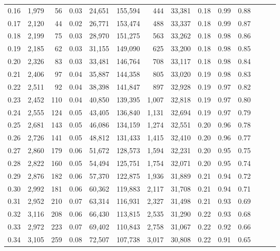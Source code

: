 \begin{tabular}{rrrrrrrrrrrrrr}
0.16 &  1,979 &   56 &  0.03 &   24,651 &  155,594 &     444 &  33,381 &  0.18 &  0.99 &      0.88 \\
0.17 &  2,120 &   44 &  0.02 &   26,771 &  153,474 &     488 &  33,337 &  0.18 &  0.99 &      0.87 \\
0.18 &  2,199 &   75 &  0.03 &   28,970 &  151,275 &     563 &  33,262 &  0.18 &  0.98 &      0.86 \\
0.19 &  2,185 &   62 &  0.03 &   31,155 &  149,090 &     625 &  33,200 &  0.18 &  0.98 &      0.85 \\
0.20 &  2,326 &   83 &  0.03 &   33,481 &  146,764 &     708 &  33,117 &  0.18 &  0.98 &      0.84 \\
0.21 &  2,406 &   97 &  0.04 &   35,887 &  144,358 &     805 &  33,020 &  0.19 &  0.98 &      0.83 \\
0.22 &  2,511 &   92 &  0.04 &   38,398 &  141,847 &     897 &  32,928 &  0.19 &  0.97 &      0.82 \\
0.23 &  2,452 &  110 &  0.04 &   40,850 &  139,395 &   1,007 &  32,818 &  0.19 &  0.97 &      0.80 \\
0.24 &  2,555 &  124 &  0.05 &   43,405 &  136,840 &   1,131 &  32,694 &  0.19 &  0.97 &      0.79 \\
0.25 &  2,681 &  143 &  0.05 &   46,086 &  134,159 &   1,274 &  32,551 &  0.20 &  0.96 &      0.78 \\
0.26 &  2,726 &  141 &  0.05 &   48,812 &  131,433 &   1,415 &  32,410 &  0.20 &  0.96 &      0.77 \\
0.27 &  2,860 &  179 &  0.06 &   51,672 &  128,573 &   1,594 &  32,231 &  0.20 &  0.95 &      0.75 \\
0.28 &  2,822 &  160 &  0.05 &   54,494 &  125,751 &   1,754 &  32,071 &  0.20 &  0.95 &      0.74 \\
0.29 &  2,876 &  182 &  0.06 &   57,370 &  122,875 &   1,936 &  31,889 &  0.21 &  0.94 &      0.72 \\
0.30 &  2,992 &  181 &  0.06 &   60,362 &  119,883 &   2,117 &  31,708 &  0.21 &  0.94 &      0.71 \\
0.31 &  2,952 &  210 &  0.07 &   63,314 &  116,931 &   2,327 &  31,498 &  0.21 &  0.93 &      0.69 \\
0.32 &  3,116 &  208 &  0.06 &   66,430 &  113,815 &   2,535 &  31,290 &  0.22 &  0.93 &      0.68 \\
0.33 &  2,972 &  223 &  0.07 &   69,402 &  110,843 &   2,758 &  31,067 &  0.22 &  0.92 &      0.66 \\
0.34 &  3,105 &  259 &  0.08 &   72,507 &  107,738 &   3,017 &  30,808 &  0.22 &  0.91 &      0.65 \\

\end{tabular}
